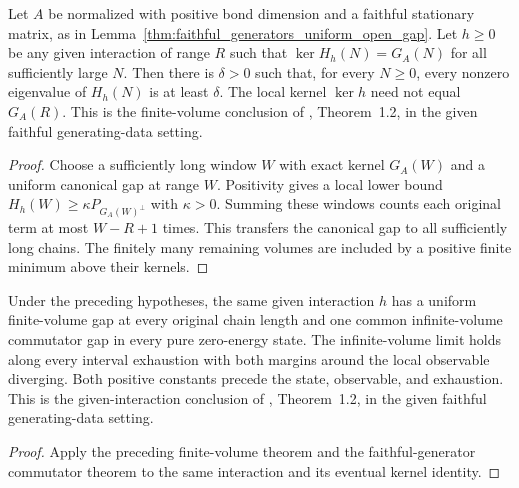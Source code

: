 \begin{lemma}
    \label{thm:faithful_generators_given_interaction_uniform_gap}
    \leanok
    Let $A$ be normalized with positive bond dimension and a faithful stationary
    matrix, as in Lemma~\ref{thm:faithful_generators_uniform_open_gap}.
    Let $h\geq0$ be any given interaction of range $R$ such that
    $\ker H_h(N)=G_A(N)$ for all sufficiently large $N$.
    Then there is $\delta>0$ such that, for every $N\geq0$, every nonzero
    eigenvalue of $H_h(N)$ is at least $\delta$.
    The local kernel $\ker h$ need not equal $G_A(R)$.
    This is the finite-volume conclusion of \cite{Nachtergaele1996Spectral},
    Theorem~1.2, in the given faithful generating-data setting.
\end{lemma}
\begin{proof}\leanok
    Choose a sufficiently long window $W$ with exact kernel $G_A(W)$ and
    a uniform canonical gap at range $W$. Positivity gives a local lower bound
    $H_h(W)\geq\kappa P_{G_A(W)^\perp}$ with $\kappa>0$.
    Summing these windows counts each original term at most $W-R+1$ times.
    This transfers the canonical gap to all sufficiently long chains. The
    finitely many remaining volumes are included by a positive finite minimum
    above their kernels.
\end{proof}

\begin{lemma}
    \label{thm:faithful_generators_given_interaction_finite_quasi_local_gap}
    \leanok
    Under the preceding hypotheses, the same given interaction $h$ has a
    uniform finite-volume gap at every original chain length and one common
    infinite-volume commutator gap in every pure zero-energy state.
    The infinite-volume limit holds along every interval exhaustion with both
    margins around the local observable diverging. Both positive constants
    precede the state, observable, and exhaustion.
    This is the given-interaction conclusion of \cite{Nachtergaele1996Spectral},
    Theorem~1.2, in the given faithful generating-data setting.
\end{lemma}
\begin{proof}\leanok
    Apply the preceding finite-volume theorem and the faithful-generator
    commutator theorem to the same interaction and its eventual kernel identity.
\end{proof}

